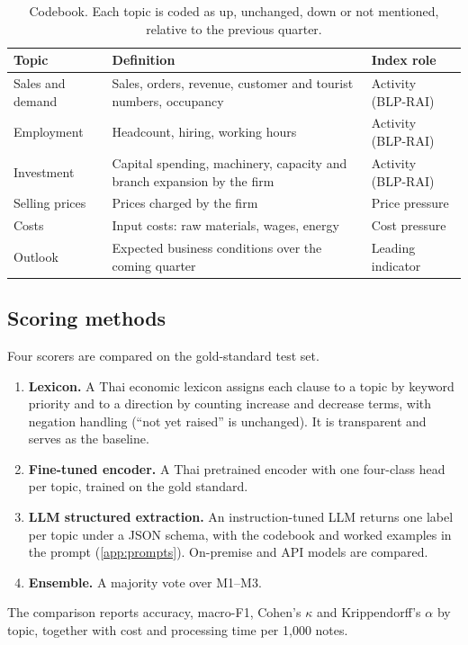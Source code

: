 \documentclass[11pt]{article}
\begin{document}
\begin{table}[tbp]
\centering\small
\caption{Codebook. Each topic is coded as up, unchanged, down or not mentioned, relative to the previous quarter.}\label{tab:codebook}
\begin{tabularx}{\textwidth}{@{}L{3.2cm}YL{3.4cm}@{}}
\toprule
Topic & Definition & Index role \\
\midrule
Sales and demand & Sales, orders, revenue, customer and tourist numbers, occupancy & Activity (BLP-RAI) \\
Employment & Headcount, hiring, working hours & Activity (BLP-RAI) \\
Investment & Capital spending, machinery, capacity and branch expansion by the firm & Activity (BLP-RAI) \\
Selling prices & Prices charged by the firm & Price pressure \\
Costs & Input costs: raw materials, wages, energy & Cost pressure \\
Outlook & Expected business conditions over the coming quarter & Leading indicator \\
\bottomrule
\end{tabularx}
\end{table}

\subsection{Scoring methods}
Four scorers are compared on the gold-standard test set.
\begin{enumerate}[label=\textbf{M\arabic*.},leftmargin=2.6em]
\item \textbf{Lexicon.} A Thai economic lexicon assigns each clause to a topic by keyword priority and to a direction by counting increase and decrease terms, with negation handling (``not yet raised'' is unchanged). It is transparent and serves as the baseline.
\item \textbf{Fine-tuned encoder.} A Thai pretrained encoder \citep{lowphansirikul2021wangchanberta} with one four-class head per topic, trained on the gold standard.
\item \textbf{LLM structured extraction.} An instruction-tuned LLM returns one label per topic under a JSON schema, with the codebook and worked examples in the prompt (\cref{app:prompts}). On-premise and API models are compared.
\item \textbf{Ensemble.} A majority vote over M1--M3.
\end{enumerate}
The comparison reports accuracy, macro-F1, Cohen's $\kappa$ and Krippendorff's $\alpha$ by topic, together with cost and processing time per 1{,}000 notes.
\end{document}
